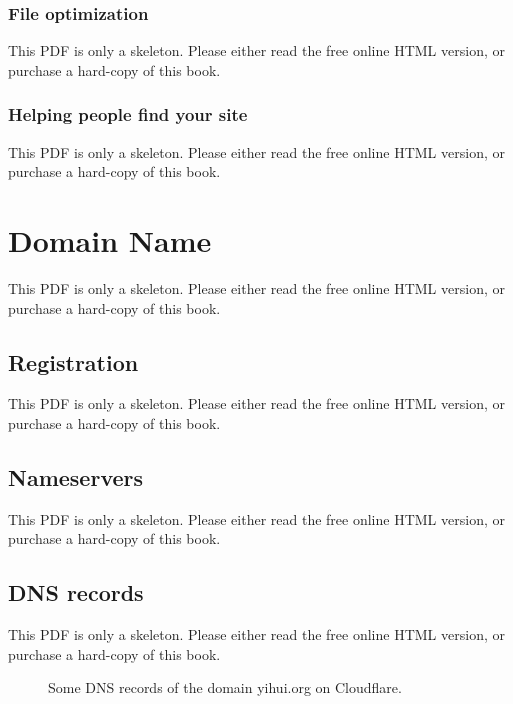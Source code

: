 \documentclass[
  12pt,
]{krantz}
\begin{document}
\subsection{File optimization}\label{file-optimization}

This PDF is only a skeleton. Please either read the free online HTML version, or purchase a hard-copy of this book.

\subsection{Helping people find your site}\label{helping-people-find-your-site}

This PDF is only a skeleton. Please either read the free online HTML version, or purchase a hard-copy of this book.

\chapter{Domain Name}\label{domain-name}

This PDF is only a skeleton. Please either read the free online HTML version, or purchase a hard-copy of this book.

\section{Registration}\label{registration}

This PDF is only a skeleton. Please either read the free online HTML version, or purchase a hard-copy of this book.

\section{Nameservers}\label{nameservers}

This PDF is only a skeleton. Please either read the free online HTML version, or purchase a hard-copy of this book.

\section{DNS records}\label{dns-records}

This PDF is only a skeleton. Please either read the free online HTML version, or purchase a hard-copy of this book.

\begin{figure}\caption{Some DNS records of the domain yihui.org on Cloudflare.}\end{figure}
\end{document}
